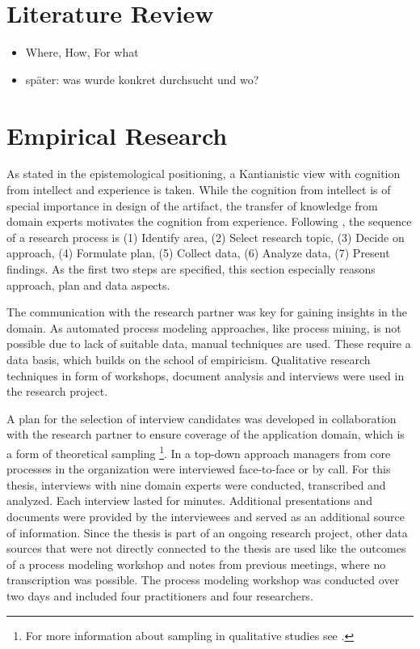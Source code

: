 		
	\section{Literature Review}
		\begin{itemize}
			\item Where, How, For what
			\item später: was wurde konkret durchsucht und wo? 
		\end{itemize}
	\section{Empirical Research}
	As stated in the epistemological positioning, a Kantianistic view with cognition from intellect and experience is taken. While the cognition from intellect is of special importance in design of the artifact, the transfer of knowledge from domain experts motivates the cognition from experience. 
	Following \cite{gilljohnson}, the sequence of a research process is (1) Identify area, (2) Select research topic, (3) Decide on approach, (4) Formulate plan, (5) Collect data, (6) Analyze data, (7) Present findings. As the first two steps are specified, this section especially reasons approach, plan and data aspects. 
	
	The communication with the research partner was key for gaining insights in the domain. As automated process modeling approaches, like process mining, is not possible due to lack of suitable data, manual techniques are used. These require a data basis, which builds on the school of empiricism. Qualitative research techniques in form of workshops, document analysis and interviews were used in the research project. 
	
	A plan for the selection of interview candidates was developed in collaboration with the research partner to ensure coverage of the application domain, which is a form of theoretical sampling \footnote{For more information about sampling in qualitative studies see \cite{coyne1997sampling}.}. In a top-down approach managers from core processes in the organization were interviewed face-to-face or by call. For this thesis, interviews with nine domain experts were conducted, transcribed and analyzed. Each interview lasted for  minutes. Additional presentations and documents were provided by the interviewees and served as an additional source of information. Since the thesis is part of an ongoing research project, other data sources that were not directly connected to the thesis are used like the outcomes of a process modeling workshop and notes from previous meetings, where no transcription was possible. The process modeling workshop was conducted over two days and included four practitioners and four researchers. 
	
